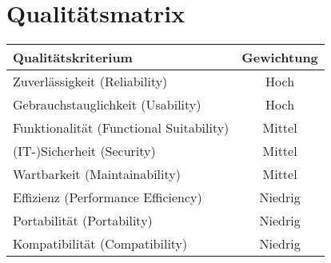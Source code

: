 \section{Qualitätsmatrix}
\begin{center}
    \begin{tabular}{ |l|c| }

        \hline
        \textbf{Qualitätskriterium} & \textbf{Gewichtung}  \\ \hline
        Zuverlässigkeit (Reliability) & \cellcolor[HTML]{40A040}Hoch\\ 
        Gebrauchstauglichkeit (Usability) & \cellcolor[HTML]{40A040}Hoch\\ 
        Funktionalität (Functional Suitability) & \cellcolor[HTML]{F0F040}Mittel\\ 
        (IT-)Sicherheit (Security) & \cellcolor[HTML]{F0F040}Mittel\\ 
        Wartbarkeit (Maintainability) & \cellcolor[HTML]{F0F040}Mittel\\ 
        Effizienz (Performance Efficiency) & \cellcolor[HTML]{E07000}Niedrig\\ 
        Portabilität (Portability) & \cellcolor[HTML]{E07000}Niedrig\\ 
        Kompatibilität (Compatibility) & \cellcolor[HTML]{E07000}Niedrig\\ \hline
        \end{tabular}
    \end{center}